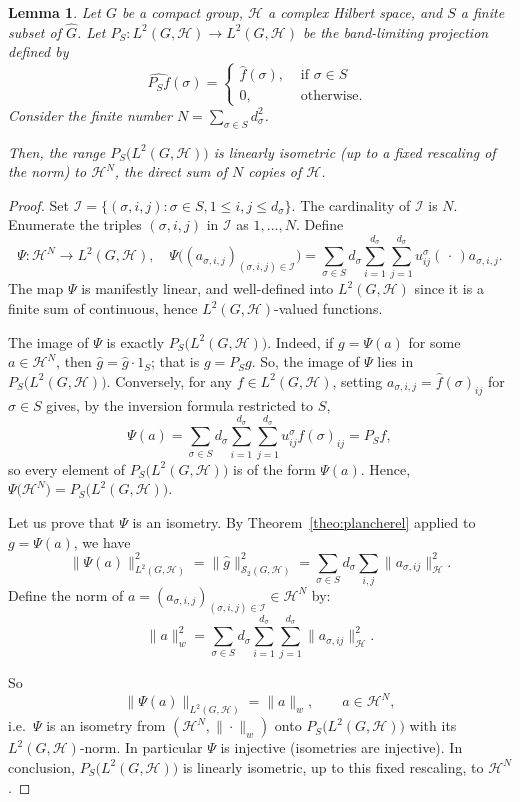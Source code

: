 \documentclass[10pt,a4paper]{amsart}
\newtheorem{lemma}[theorem]{Lemma}
\begin{document}
\begin{lemma}\label{lem:PS-finite-dim}
Let $G$ be a compact group, $\mathcal{H}$ a complex Hilbert space, and $S$  a finite subset of $\widehat{G}$.
Let $P_S:L^2(G,\mathcal{H})\to L^2(G,\mathcal{H})$ be the band-limiting projection defined by
$$\widehat{P_Sf}(\sigma)=\left\lbrace\begin{array}{cc}
\widehat f(\sigma), & \text{ if } \sigma\in S\\ 
0, & \text{ otherwise. }
\end{array}\right.$$ 
 Consider the finite number $
N=\sum\limits_{\sigma\in S}d_\sigma^2$.

Then, the range $P_S\big(L^2(G,\mathcal{H})\big)$ is
linearly isometric (up to a fixed rescaling of the norm) to $\mathcal{H}^N$,  the
direct sum of $N$ copies of $\mathcal{H}$.
\end{lemma}

\begin{proof}
 Set $\mathcal{I}=\{(\sigma,i,j): \sigma\in S, 1\le i,j\le d_\sigma\}$. The cardinality of $\mathcal{I}$ is $N$. Enumerate the  triples
$(\sigma,i,j)$ in  $\mathcal{I}$  as $1,\dots,N$. Define
$$
\Psi:\mathcal{H}^N\longrightarrow L^2(G,\mathcal{H}),\quad
\Psi\big((a_{\sigma,i,j})_{(\sigma,i,j)\in \mathcal{I}} \big)=\sum_{\sigma\in S}d_\sigma
\sum_{i=1}^{d_\sigma}\sum_{j=1}^{d_\sigma}u^\sigma_{ij}(\,\cdot\,)a_{\sigma,i,j}.
$$
The map $\Psi$ is manifestly linear, and well-defined into $L^2(G,\mathcal{H})$ since it is a finite sum
of continuous, hence $L^2(G,\mathcal{H})$-valued functions.

\noindent The image of $\Psi$ is exactly $P_S\big(L^2(G,\mathcal{H})\big)$. Indeed, if $g=\Psi(a)$
for some $a\in\mathcal{H}^N$, then
 $\widehat{g}=\widehat{g}\cdot 1_S$; that is  $g=P_Sg$. So,  the image of $\Psi$ lies in
$P_S\big(L^2(G,\mathcal{H})\big)$. Conversely, for any $f\in L^2(G,\mathcal{H})$, setting
$a_{\sigma,i,j}=\hat f(\sigma)_{ij}$ for $\sigma\in S$ gives, by the inversion formula
restricted to $S$,
$$
\Psi(a)=\sum_{\sigma\in S}d_\sigma\sum_{i=1}^{d_\sigma}\sum_{j=1}^{d_\sigma}u^\sigma_{ij}\widehat f(\sigma)_{ij}=P_Sf,
$$
so every element of $P_S\big(L^2(G,\mathcal{H})\big)$ is of the form $\Psi(a)$. Hence,
$\Psi\big(\mathcal{H}^N\big)=P_S\big(L^2(G,\mathcal{H})\big)$.

Let us prove that  $\Psi$ is an  isometry.  By  Theorem~\ref{theo:plancherel} applied to $g=\Psi(a)$, we have 
$$
\|\Psi(a)\|_{L^2(G,\mathcal{H})}^2=\|\widehat{g}\|_{\mathscr{S}_2(G,\mathcal{H})}^2=\sum_{\sigma\in S}
d_\sigma\sum_{i,j}\|a_{\sigma,ij}\|_\mathcal{H}^2.
$$
Define the norm of  $a=(a_{\sigma,i,j})_{(\sigma,i,j)\in \mathcal{I}}\in \mathcal{H}^N$  by:
$$\|a\|_{w}^2=\sum_{\sigma\in S}d_\sigma\sum_{i=1}^{d_\sigma}\sum_{j=1}^{d_\sigma}\|a_{\sigma,ij}\|_\mathcal{H}^2.$$ 

So
\[
\|\Psi(a)\|_{L^2(G,\mathcal{H})}=\|a\|_w,\qquad a\in\mathcal{H}^N,
\]
i.e.\ $\Psi$ is an isometry from $(\mathcal{H}^N,\|\cdot\|_w)$ onto $P_S\big(L^2(G,\mathcal{H})\big)$
with its $L^2(G,\mathcal{H})$-norm. In particular $\Psi$ is injective (isometries are
injective). In conclusion, 
 $P_S\big(L^2(G,\mathcal{H})\big)$ is linearly isometric, up to this fixed rescaling, to
$\mathcal{H}^N$.
\end{proof}
\end{document}
